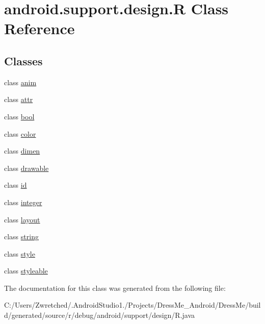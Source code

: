 \hypertarget{classandroid_1_1support_1_1design_1_1_r}{}\section{android.\+support.\+design.\+R Class Reference}
\label{classandroid_1_1support_1_1design_1_1_r}
\subsection*{Classes}
\begin{DoxyCompactItemize}
\item 
class \hyperlink{classandroid_1_1support_1_1design_1_1_r_1_1anim}{anim}
\item 
class \hyperlink{classandroid_1_1support_1_1design_1_1_r_1_1attr}{attr}
\item 
class \hyperlink{classandroid_1_1support_1_1design_1_1_r_1_1bool}{bool}
\item 
class \hyperlink{classandroid_1_1support_1_1design_1_1_r_1_1color}{color}
\item 
class \hyperlink{classandroid_1_1support_1_1design_1_1_r_1_1dimen}{dimen}
\item 
class \hyperlink{classandroid_1_1support_1_1design_1_1_r_1_1drawable}{drawable}
\item 
class \hyperlink{classandroid_1_1support_1_1design_1_1_r_1_1id}{id}
\item 
class \hyperlink{classandroid_1_1support_1_1design_1_1_r_1_1integer}{integer}
\item 
class \hyperlink{classandroid_1_1support_1_1design_1_1_r_1_1layout}{layout}
\item 
class \hyperlink{classandroid_1_1support_1_1design_1_1_r_1_1string}{string}
\item 
class \hyperlink{classandroid_1_1support_1_1design_1_1_r_1_1style}{style}
\item 
class \hyperlink{classandroid_1_1support_1_1design_1_1_r_1_1styleable}{styleable}
\end{DoxyCompactItemize}


The documentation for this class was generated from the following file\+:\begin{DoxyCompactItemize}
\item 
C\+:/\+Users/\+Zwretched/.\+Android\+Studio1./\+Projects/\+Dress\+Me\+\_\+\+Android/\+Dress\+Me/build/generated/source/r/debug/android/support/design/R.\+java\end{DoxyCompactItemize}
